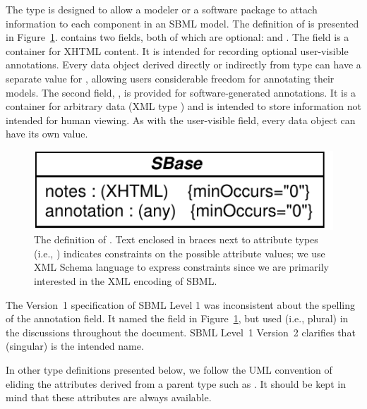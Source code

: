 \documentclass[10pt]{cekarticle}
\newcommand{\vref}[1]{\ref{#1}}
\newcommand{\changed}[1]{\textcolor{BrickRed}{#1}}
\begin{document}
The type  is designed to allow a modeler or a software package
to attach information to each component in an SBML model.  The definition
of  is presented in Figure~\vref{fig:identified}.
 contains two fields, both of which are optional:
 and \changed{}.  The field 
is a container for XHTML content.  It is intended for recording optional
user-visible annotations.  Every data object derived directly or indirectly
from type  can have a separate value for ,
allowing users considerable freedom for annotating their models.  The
second field, \changed{}, is provided for
software-generated annotations.  It is a container for arbitrary data (XML
type ) and is intended to store information not intended for
human viewing.  As with the user-visible  field, every data
object can have its own \changed{} value.

\begin{figure}[thb]
  \centering
  \includegraphics[scale = 0.65]{identified}
  \caption{The definition of .  Text enclosed in braces next
    to attribute types (i.e., ) indicates
    constraints on the possible attribute values; we use XML Schema
    language to express constraints since we are primarily interested in
    the XML encoding of SBML.}
  \label{fig:identified}
\end{figure}

\changed{The Version~1 specification of SBML Level 1 was inconsistent about
  the spelling of the annotation field.  It named the field
  \attrib{annotation} in Figure~\ref{fig:identified}, but used
  \attrib{annotations} (i.e., plural) in the discussions throughout the
  document.  SBML Level~1 Version~2 clarifies that \attrib{annotation} (singular) is the
  intended name.}

In other type definitions presented below, we follow the UML convention of
eliding the attributes derived from a parent type such as .
It should be kept in mind that these attributes are always available.
\end{document}
